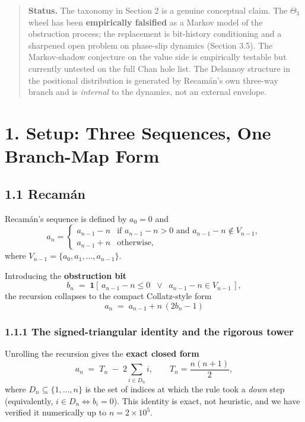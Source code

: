 \documentclass[
  11pt,
]{article}
\begin{document}
\begin{quote}
\textbf{Status.} The taxonomy in Section 2 is a genuine conceptual
claim. The \(\Theta_3\) wheel has been \textbf{empirically falsified} as
a Markov model of the obstruction process; the replacement is
bit-history conditioning and a sharpened open problem on phase-slip
dynamics (Section 3.5). The Markov-shadow conjecture on the value side
is empirically testable but currently untested on the full Chan hole
list. The Delannoy structure in the positional distribution is generated
by Recamán's own three-way branch and is \emph{internal} to the
dynamics, not an external envelope.
\end{quote}

\hypertarget{setup-three-sequences-one-branch-map-form}{%
\section{1. Setup: Three Sequences, One Branch-Map
Form}\label{setup-three-sequences-one-branch-map-form}}

\hypertarget{recamuxe1n}{%
\subsection{1.1 Recamán}\label{recamuxe1n}}

Recamán's sequence is defined by \(a_0 = 0\) and \[
a_n = \begin{cases} a_{n-1} - n & \text{if } a_{n-1} - n > 0 \text{ and } a_{n-1} - n \notin V_{n-1}, \\ a_{n-1} + n & \text{otherwise,} \end{cases}
\] where \(V_{n-1} = \{a_0, a_1, \dots, a_{n-1}\}\).

Introducing the \textbf{obstruction bit} \[
b_n \;=\; \mathbf{1}\!\left[\,a_{n-1} - n \le 0 \;\;\lor\;\; a_{n-1} - n \in V_{n-1}\,\right],
\] the recursion collapses to the compact Collatz-style form \[
\boxed{\;a_n \;=\; a_{n-1} + n\,(2 b_n - 1)\;}
\]

\hypertarget{the-signed-triangular-identity-and-the-rigorous-tower}{%
\subsubsection{1.1.1 The signed-triangular identity and the rigorous
tower}\label{the-signed-triangular-identity-and-the-rigorous-tower}}

Unrolling the recursion gives the \textbf{exact closed form} \[
\boxed{\;a_n \;=\; T_n \;-\; 2 \sum_{i \in D_n} i, \qquad T_n = \frac{n(n+1)}{2},\;}
\] where \(D_n \subseteq \{1, \dots, n\}\) is the set of indices at
which the rule took a \emph{down} step (equivalently,
\(i \in D_n \iff b_i = 0\)). This identity is exact, not heuristic, and
we have verified it numerically up to \(n = 2 \times 10^5\).
\end{document}
